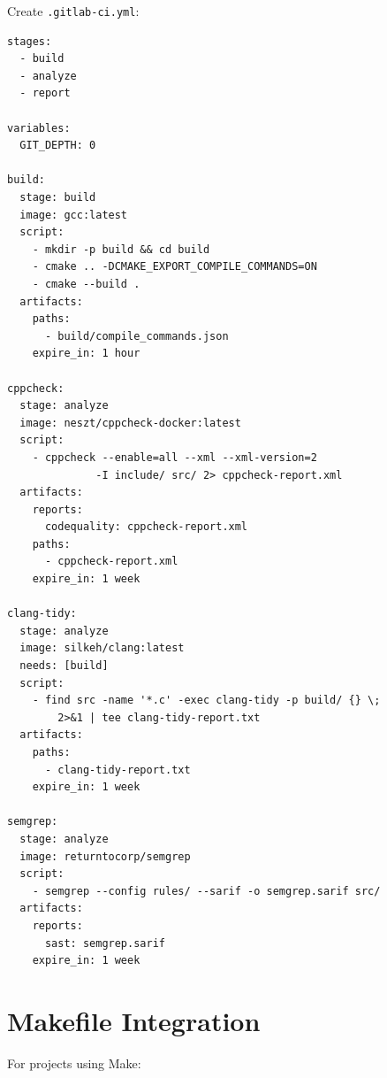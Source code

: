 \documentclass[11pt,letterpaper]{report}
\begin{document}
Create \texttt{.gitlab-ci.yml}:

\begin{lstlisting}[style=yamlstyle]
stages:
  - build
  - analyze
  - report

variables:
  GIT_DEPTH: 0

build:
  stage: build
  image: gcc:latest
  script:
    - mkdir -p build && cd build
    - cmake .. -DCMAKE_EXPORT_COMPILE_COMMANDS=ON
    - cmake --build .
  artifacts:
    paths:
      - build/compile_commands.json
    expire_in: 1 hour

cppcheck:
  stage: analyze
  image: neszt/cppcheck-docker:latest
  script:
    - cppcheck --enable=all --xml --xml-version=2
              -I include/ src/ 2> cppcheck-report.xml
  artifacts:
    reports:
      codequality: cppcheck-report.xml
    paths:
      - cppcheck-report.xml
    expire_in: 1 week

clang-tidy:
  stage: analyze
  image: silkeh/clang:latest
  needs: [build]
  script:
    - find src -name '*.c' -exec clang-tidy -p build/ {} \;
        2>&1 | tee clang-tidy-report.txt
  artifacts:
    paths:
      - clang-tidy-report.txt
    expire_in: 1 week

semgrep:
  stage: analyze
  image: returntocorp/semgrep
  script:
    - semgrep --config rules/ --sarif -o semgrep.sarif src/
  artifacts:
    reports:
      sast: semgrep.sarif
    expire_in: 1 week
\end{lstlisting}

\section{Makefile Integration}

For projects using Make:
\end{document}
